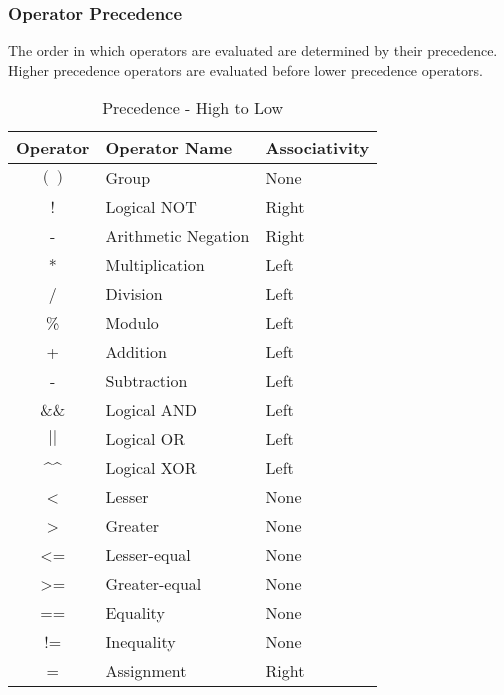 \documentclass{article}
\begin{document}
\subsubsection{Operator Precedence}
The order in which operators are evaluated are determined by their precedence.
Higher precedence operators are evaluated before lower precedence operators.

\begin{table}[!ht]
\begin{center}
	\caption{Precedence - High to Low}
\begin{tabular}{|c|l|l|}
	\hline
	Operator & Operator Name & Associativity \\
	\hline
	$( )$              & Group               & None  \\
	!                  & Logical NOT         & Right \\
	-                  & Arithmetic Negation & Right \\

	*                  & Multiplication      & Left \\
	/                  & Division            & Left \\
	\%                 & Modulo              & Left \\

	+                  & Addition            & Left \\
	-                  & Subtraction         & Left \\

	\&\&               & Logical AND         & Left \\
	$||$               & Logical OR          & Left \\
	\^{}\^{}           & Logical XOR         & Left \\

	\textless          & Lesser              & None \\
	\textgreater       & Greater             & None \\
	\textless=         & Lesser-equal        & None \\
	\textgreater=      & Greater-equal       & None \\

	==                 & Equality            & None \\
	!=                 & Inequality          & None \\

	=                  & Assignment          & Right \\
	\hline
\end{tabular}
\end{center}
\end{table}
\end{document}
